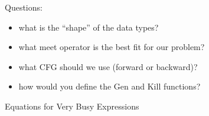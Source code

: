\begin{frame}
	Questions:
	
	\begin{itemize}
		\item what is the ``shape'' of the data types? \pause
		\item what {\color{blue}meet} operator is the best fit for our problem?
		\item what {\color{blue}CFG} should we use (forward or backward)?   
		\item how would you define the {\color{blue}Gen} and {\color{blue}Kill} functions?   
	\end{itemize}
	
\end{frame}

\begin{frame}{Equations for Very Busy Expressions}
\end{frame}

